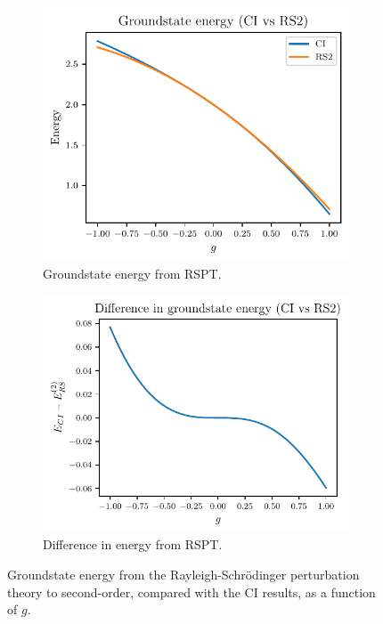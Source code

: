 \begin{figure}[htbp]
    \centering
    \begin{subfigure}[b]{0.45\textwidth}
        \centering
        \includegraphics[width=\textwidth]{figures/f_groundstate_energy.pdf}
        \caption{
            Groundstate energy from RSPT.\label{fig:rs2_energy}
        }
    \end{subfigure}
    \hfill
    \begin{subfigure}[b]{0.48\textwidth}
        \centering
        \includegraphics[width=\textwidth]{figures/f_groundstate_energy_diff.pdf}
        \caption{
            Difference in energy from RSPT.\label{fig:rs2_diff}
        }
    \end{subfigure}
    \caption{
        Groundstate energy from the Rayleigh-Schr\"odinger perturbation theory to second-order, compared with the CI results, as a function of $g$.
    }
\end{figure}

